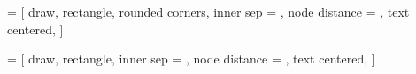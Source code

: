 \newcommand{\mat}[1]{\boldsymbol{#1}}
\renewcommand{\vec}[1]{\boldsymbol{#1}}

\let\oldhat\hat
\renewcommand{\hat}[1]{\oldhat{\mathbf{#1}}}

\newcommand{\bias}[1]{\oldhat{#1}}

\newcommand*\widefbox[1]{\fbox{\hspace{2em}#1\hspace{2em}}}

\makeatletter
\let\mcnewpage=\newpage
\newcommand{\TrickSupertabularIntoMulticols}{%
  \renewcommand\newpage{%
    \if@firstcolumn
      \hrule width\linewidth height0pt
      \columnbreak
    \else
      \mcnewpage
    \fi
  }%
}
\makeatother



\usetikzlibrary{positioning, fit, calc, shapes, arrows}

\newlength{\innersep}
\setlength{\innersep}{2ex}

\newlength{\nodesep}
\setlength{\nodesep}{0.625cm}

\newlength{\lengthSolution}
\settowidth{\lengthSolution}{Solution}

\newlength{\lengthAdjoint}
\settowidth{\lengthAdjoint}{Adjoint}

\newlength{\lengthForward}
\settowidth{\lengthForward}{Forward}

\newlength{\lengthDenovo}
\settowidth{\lengthDenovo}{Denovo}

\newlength{\lengthww}
\settowidth{\lengthww}{$ww$}


 = [
    draw,
    rectangle,
    rounded corners,
    inner sep = \innersep,
    node distance = \nodesep,
    text centered,
]

 = [
    draw,
    rectangle,
    inner sep = \innersep,
    node distance = \nodesep,
    text centered,
]

